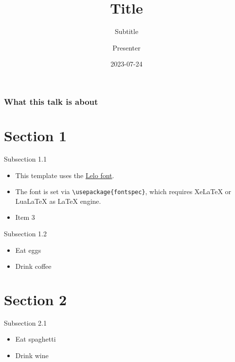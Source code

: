 \documentclass[
  10pt,
  ignorenonframetext,
  aspectratio=169,
xcolor = dvipsnames
]{beamer}
\title{Title}
\subtitle{Subtitle}
\author{Presenter}
\date{2023-07-24}
\institute{Institute}
\providecommand{\tightlist}{%
  \setlength{\itemsep}{0pt}\setlength{\parskip}{0pt}}
\begin{document}
\begin{frame}[plain]{}
  \titlepage
\end{frame}

\begin{frame}
  \frametitle{What this talk is about}
  \tableofcontents
\end{frame}
\hypertarget{section-1}{%
\section{Section 1}\label{section-1}}

\begin{frame}[fragile]{Subsection 1.1}
\protect\hypertarget{subsection-1.1}{}
\begin{itemize}
\tightlist
\item
  This template uses the \href{https://camelot-typefaces.com/lelo}{Lelo
  font}.
\item
  The font is set via \texttt{\textbackslash{}usepackage\{fontspec\}},
  which requires XeLaTeX or LuaLaTeX as LaTeX engine.
\item
  Item 3
\end{itemize}
\end{frame}

\begin{frame}{Subsection 1.2}
\protect\hypertarget{subsection-1.2}{}
\begin{itemize}
\tightlist
\item
  Eat eggs
\item
  Drink coffee
\end{itemize}
\end{frame}

\hypertarget{section-2}{%
\section{Section 2}\label{section-2}}

\begin{frame}{Subsection 2.1}
\protect\hypertarget{subsection-2.1}{}
\begin{itemize}
\tightlist
\item
  Eat spaghetti
\item
  Drink wine
\end{itemize}
\end{frame}
\end{document}

